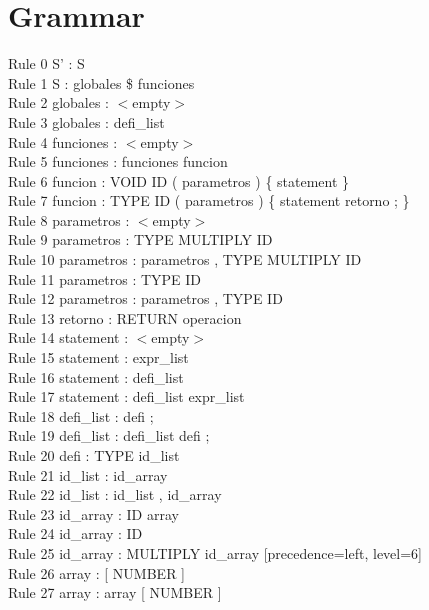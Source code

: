 \documentclass[]{article}
\begin{document}
        \section{Grammar}
        Rule 0     S' : S\\
        Rule 1     S : globales \$ funciones\\
        Rule 2     globales : $<$empty$>$\\
        Rule 3     globales : defi\_list\\
        Rule 4     funciones : $<$empty$>$\\
        Rule 5     funciones : funciones funcion\\
        Rule 6     funcion : VOID ID ( parametros ) \{ statement \}\\
        Rule 7     funcion : TYPE ID ( parametros ) \{ statement retorno ; \}\\
        Rule 8     parametros : $<$empty$>$\\
        Rule 9     parametros : TYPE MULTIPLY ID\\
        Rule 10    parametros : parametros , TYPE MULTIPLY ID\\
        Rule 11    parametros : TYPE ID\\
        Rule 12    parametros : parametros , TYPE ID\\
        Rule 13    retorno : RETURN operacion\\
        Rule 14    statement : $<$empty$>$\\
        Rule 15    statement : expr\_list\\
        Rule 16    statement : defi\_list\\
        Rule 17    statement : defi\_list expr\_list\\
        Rule 18    defi\_list : defi ;\\
        Rule 19    defi\_list : defi\_list defi ;\\
        Rule 20    defi : TYPE id\_list\\
        Rule 21    id\_list : id\_array\\
        Rule 22    id\_list : id\_list , id\_array\\
        Rule 23    id\_array : ID array\\
        Rule 24    id\_array : ID\\
        Rule 25    id\_array : MULTIPLY id\_array  [precedence=left, level=6]\\
        Rule 26    array : [ NUMBER ]\\
        Rule 27    array : array [ NUMBER ]\\
\end{document}
